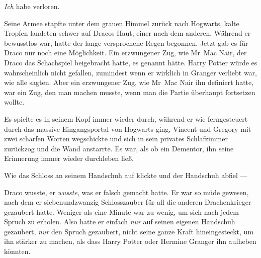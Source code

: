 \emph{Ich} habe verloren.

Seine Armee stapfte unter dem grauen Himmel zurück nach Hogwarts, kalte Tropfen landeten schwer auf Dracos Haut, einer nach dem anderen. Während er bewusstlos war, hatte der lange versprochene Regen begonnen. Jetzt gab es für Draco nur noch eine Möglichkeit. Ein erzwungener Zug, wie Mr~Mac Nair, der Draco das Schachspiel beigebracht hatte, es genannt hätte. Harry Potter würde es wahrscheinlich nicht gefallen, zumindest wenn er wirklich in Granger verliebt war, wie alle sagten. Aber ein erzwungener Zug, wie Mr~Mac Nair ihn definiert hatte, war ein Zug, den man machen musste, wenn man die Partie überhaupt fortsetzen wollte.

Es spielte es in seinem Kopf immer wieder durch, während er wie ferngesteuert durch das massive Eingangsportal von Hogwarts ging, Vincent und Gregory mit zwei scharfen Worten wegschickte und sich in sein privates Schlafzimmer zurückzog und die Wand anstarrte. Es war, als ob ein Dementor, ihn seine Erinnerung immer wieder durchleben ließ.

Wie das Schloss an seinem Handschuh auf klickte und der Handschuh abfiel —

Draco wusste, er \emph{wusste}, was er falsch gemacht hatte. Er war so müde gewesen, nach dem er siebenundzwanzig Schlosszauber für all die anderen Drachenkrieger gezaubert hatte. Weniger als eine Minute war zu wenig, um sich nach jedem Spruch zu erholen. Also hatte er einfach \emph{nur}  auf seinen eigenen Handschuh gezaubert, \emph{nur} den Spruch gezaubert, nicht seine ganze Kraft hineingesteckt, um ihn stärker zu machen, als dass Harry Potter oder Hermine Granger ihn aufheben könnten.

